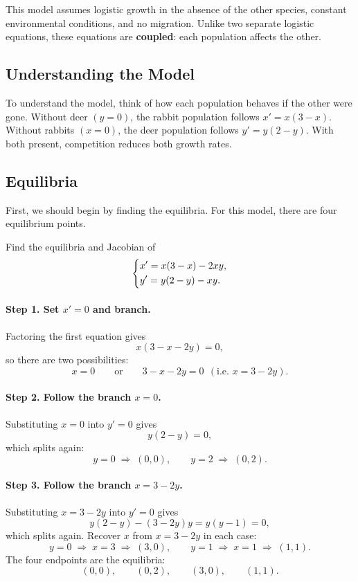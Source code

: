 \documentclass[10pt,letterpaper]{article}
\begin{document}
This model assumes logistic growth in the absence of the other species,
constant environmental conditions, and no migration. Unlike two
separate logistic equations, these equations are \textbf{coupled}:
each population affects the other.

\subsection{Understanding the Model}
To understand the model, think of how each population behaves if the other were gone.
Without deer $(y=0)$, the rabbit population follows $x'=x(3-x)$.
Without rabbits $(x=0)$, the deer population follows $y'=y(2-y)$.
With both present, competition reduces both growth rates.

\subsection{Equilibria}
First, we should begin by finding the equilibria. For this model, there are four equilibrium points.

\begin{example}[1]{
Find the equilibria and Jacobian of
\[
\begin{dcases}
x'=x(3-x)-2xy,\\
y'=y(2-y)-xy.
\end{dcases}
\]
}

\paragraph{Step 1. Set $x'=0$ and branch.}
Factoring the first equation gives
\[
x(3-x-2y)=0,
\]
so there are two possibilities:
\[
x=0\qquad\text{or}\qquad 3-x-2y=0\ \ (\text{i.e. } x=3-2y).
\]

\paragraph{Step 2. Follow the branch $x=0$.}
Substituting $x=0$ into $y'=0$ gives
\[
y(2-y)=0,
\]
which splits again:
\[
y=0 \;\Rightarrow\; (0,0),
\qquad
y=2 \;\Rightarrow\; (0,2).
\]

\paragraph{Step 3. Follow the branch $x=3-2y$.}
Substituting $x=3-2y$ into $y'=0$ gives
\[
y(2-y)-(3-2y)y=y(y-1)=0,
\]
which splits again. Recover $x$ from $x=3-2y$ in each case:
\[
y=0 \;\Rightarrow\; x=3 \;\Rightarrow\; (3,0),
\qquad
y=1 \;\Rightarrow\; x=1 \;\Rightarrow\; (1,1).
\]
The four endpoints are the equilibria:
\[
\boxed{(0,0),\qquad(0,2),\qquad(3,0),\qquad(1,1).}
\]

\end{example}
\end{document}
